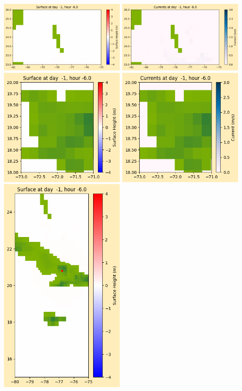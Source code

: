 \documentclass[11pt]{article}
\begin{document}
\vskip 10pt 
\includegraphics[width=0.475\textwidth]{frame0007fig1003.png}
\includegraphics[width=0.475\textwidth]{frame0007fig1004.png}
\vskip 10pt 
\includegraphics[width=0.475\textwidth]{frame0007fig1005.png}
\includegraphics[width=0.475\textwidth]{frame0007fig1006.png}
\vskip 10pt 
\includegraphics[width=0.475\textwidth]{frame0007fig1007.png}
\end{document}

